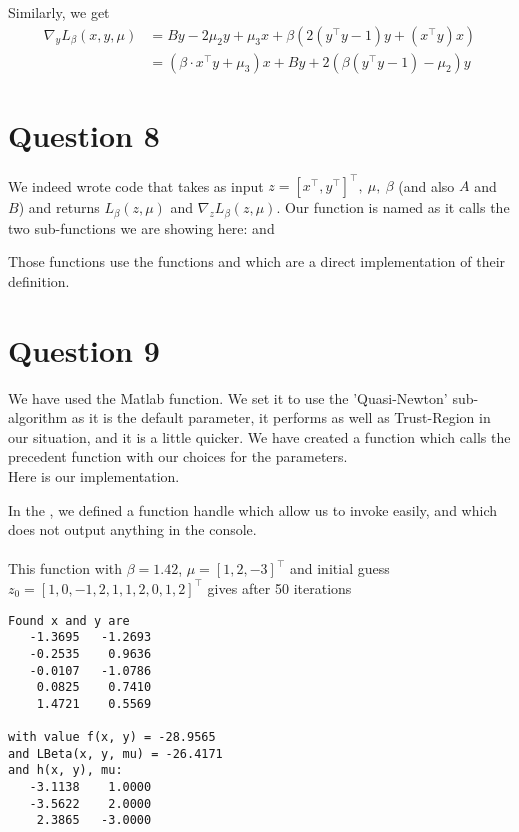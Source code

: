 \documentclass{article}
\newcommand{\tp}{^\top}
\begin{document}
Similarly, we get
\begin{align*}
\nabla_y L_\beta(x,y,\mu)&=By - 2\mu_2 y+\mu_3 x+\beta \left( 2(y\tp y-1)  y+(x\tp y ) x \right) \\
&=(\beta \cdot x\tp y + \mu_3)x+ By + 2(\beta (y\tp y-1) - \mu_2) y
\end{align*}


\section*{Question 8}

We indeed wrote code that takes as input $z = [x\tp, y\tp]\tp,\ \mu,\ \beta$ (and also $A$ and $B$) and returns $L_\beta(z, \mu)$ and $\nabla_z L_\beta(z, \mu)$.
Our function is named  as it calls the two sub-functions we are showing here:  and 






Those functions use the functions  and  which are a direct implementation of their definition.

\section*{Question 9}

We have used the Matlab  function. We set it to use the 'Quasi-Newton' sub-algorithm as it is the default parameter, it performs as well as Trust-Region in our situation, and it is a little quicker.
We have created a function  which calls the precedent function with our choices for the parameters.\\
Here is our implementation.



In the , we defined a function handle which allow us to invoke  easily, and which does not output anything in the console.\\
\\
This function with $\beta = 1.42$, $\mu = [1, 2, -3]\tp$ and initial guess $z_0 = [1, 0, -1, 2, 1, 1, 2, 0, 1, 2]\tp$  gives after 50 iterations
\begin{lstlisting}
Found x and y are
   -1.3695   -1.2693
   -0.2535    0.9636
   -0.0107   -1.0786
    0.0825    0.7410
    1.4721    0.5569

with value f(x, y) = -28.9565
and LBeta(x, y, mu) = -26.4171
and h(x, y), mu:
   -3.1138    1.0000
   -3.5622    2.0000
    2.3865   -3.0000
\end{lstlisting}
\end{document}
